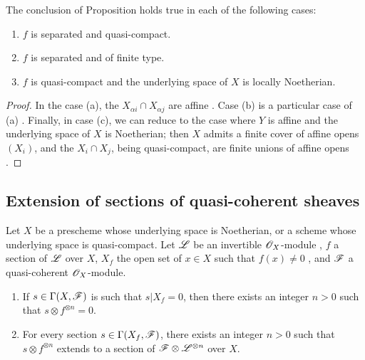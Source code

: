 \begin{cor}[9.2.2]
\label{1.9.2.2}
The conclusion of Proposition  holds true in each of the following cases:
\begin{enumerate}[label=\emph{(\alph*)}]
  \item $f$ is separated and quasi-compact.
  \item $f$ is separated and of finite type.
  \item $f$ is quasi-compact and the underlying space of $X$ is locally Noetherian.
\end{enumerate}
\end{cor}

\begin{proof}
\label{proof-1.9.2.2}
In the case (a), the $X_{\alpha i}\cap X_{\alpha j}$ are affine .
Case (b) is a particular case of (a) . Finally, in case (c), we can reduce to the case where $Y$ is affine and the underlying space of $X$ is Noetherian; then $X$ admits a finite cover of affine opens $(X_i)$, and the $X_i\cap X_j$, being quasi-compact, are finite unions of affine opens .
\end{proof}

\subsection{Extension of sections of quasi-coherent sheaves}
\label{subsection:extension-of-sections-of-qcoh}

\begin{thm}[9.3.1]
\label{1.9.3.1}
Let $X$ be a prescheme whose underlying space is Noetherian, or a scheme whose underlying
space is quasi-compact. Let $\mathscr{L}$ be an invertible $\mathscr{O}_X$-module , $f$ a
section of $\mathscr{L}$ over $X$, $X_f$ the open set of $x\in X$ such that $f(x)\neq0$
, and $\mathscr{F}$ a quasi-coherent $\mathscr{O}_X$-module.
\begin{enumerate}[label=\emph{(\roman*)}]
  \item If $s\in\Gamma(X,\mathscr{F})$ is such that $s|X_f=0$, then there exists an integer $n>0$ such that $s\otimes f^{\otimes n}=0$.
  \item For every section $s\in\Gamma(X_f,\mathscr{F})$, there exists an integer $n>0$ such that $s\otimes f^{\otimes n}$ extends to a section of $\mathscr{F}\otimes\mathscr{L}^{\otimes n}$ over $X$.
\end{enumerate}
\end{thm}

